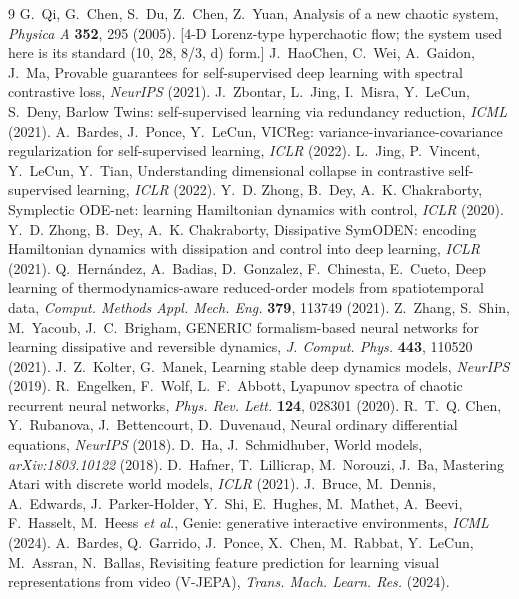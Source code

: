 \documentclass[11pt]{article}
\begin{document}
\begin{thebibliography}{9}
 G.~Qi, G.~Chen, S.~Du, Z.~Chen, Z.~Yuan, Analysis of a new chaotic system, \emph{Physica A} \textbf{352}, 295 (2005). [4-D Lorenz-type hyperchaotic flow; the system used here is its standard (10, 28, 8/3, d) form.]
 J.~HaoChen, C.~Wei, A.~Gaidon, J.~Ma, Provable guarantees for self-supervised deep learning with spectral contrastive loss, \emph{NeurIPS} (2021).
 J.~Zbontar, L.~Jing, I.~Misra, Y.~LeCun, S.~Deny, Barlow Twins: self-supervised learning via redundancy reduction, \emph{ICML} (2021).
 A.~Bardes, J.~Ponce, Y.~LeCun, VICReg: variance-invariance-covariance regularization for self-supervised learning, \emph{ICLR} (2022).
 L.~Jing, P.~Vincent, Y.~LeCun, Y.~Tian, Understanding dimensional collapse in contrastive self-supervised learning, \emph{ICLR} (2022).
 Y.~D. Zhong, B.~Dey, A.~K. Chakraborty, Symplectic ODE-net: learning Hamiltonian dynamics with control, \emph{ICLR} (2020).
 Y.~D. Zhong, B.~Dey, A.~K. Chakraborty, Dissipative SymODEN: encoding Hamiltonian dynamics with dissipation and control into deep learning, \emph{ICLR} (2021).
 Q.~Hern\'andez, A.~Badias, D.~Gonzalez, F.~Chinesta, E.~Cueto, Deep learning of thermodynamics-aware reduced-order models from spatiotemporal data, \emph{Comput. Methods Appl. Mech. Eng.} \textbf{379}, 113749 (2021).
 Z.~Zhang, S.~Shin, M.~Yacoub, J.~C.~Brigham, GENERIC formalism-based neural networks for learning dissipative and reversible dynamics, \emph{J. Comput. Phys.} \textbf{443}, 110520 (2021).
 J.~Z.~Kolter, G.~Manek, Learning stable deep dynamics models, \emph{NeurIPS} (2019).
 R.~Engelken, F.~Wolf, L.~F.~Abbott, Lyapunov spectra of chaotic recurrent neural networks, \emph{Phys. Rev. Lett.} \textbf{124}, 028301 (2020).
 R.~T.~Q. Chen, Y.~Rubanova, J.~Bettencourt, D.~Duvenaud, Neural ordinary differential equations, \emph{NeurIPS} (2018).
 D.~Ha, J.~Schmidhuber, World models, \emph{arXiv:1803.10122} (2018).
 D.~Hafner, T.~Lillicrap, M.~Norouzi, J.~Ba, Mastering Atari with discrete world models, \emph{ICLR} (2021).
 J.~Bruce, M.~Dennis, A.~Edwards, J.~Parker-Holder, Y.~Shi, E.~Hughes, M.~Mathet, A.~Beevi, F.~Hasselt, M.~Heess \emph{et al.}, Genie: generative interactive environments, \emph{ICML} (2024).
 A.~Bardes, Q.~Garrido, J.~Ponce, X.~Chen, M.~Rabbat, Y.~LeCun, M.~Assran, N.~Ballas, Revisiting feature prediction for learning visual representations from video (V-JEPA), \emph{Trans. Mach. Learn. Res.} (2024).

\end{thebibliography}
\end{document}

